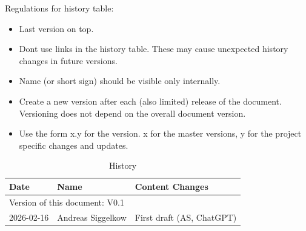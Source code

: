 Regulations for history table:
\begin{itemize}
  \item Last version on top.
  \item Dont use links in the history table. These may cause unexpected history changes in future versions.
  \item Name (or short sign) should be visible only internally.
  \item Create a new version after each (also limited) release of the document. Versioning does not depend on the overall document version.
  \item Use the form x.y for the version. x for the master versions, y for the project specific changes and updates.
\end{itemize}

\begin{table}[H]
\caption{History}
\label{tab:qspihistory01a}
\centering
\begin{tabularx}{\textwidth}{|X |X |X |}
  \hline
  Date & Name & Content Changes \\
  \hline
  \multicolumn{3}{|l|}{Version of this document: V0.1} \\
  \hline
  2026-02-16 & Andreas Siggelkow & First draft (AS, ChatGPT) \\
  \hline
\end{tabularx}
\end{table}
